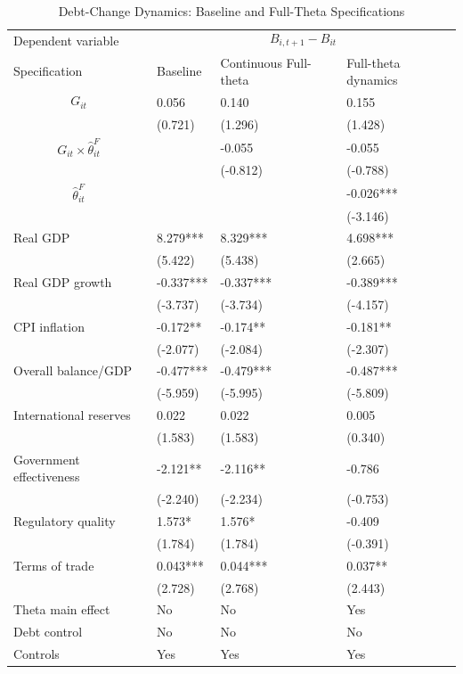 \begin{table}[H]\centering
\begin{threeparttable}
\caption{Debt-Change Dynamics: Baseline and Full-Theta Specifications}
\label{tab:debt_change_combined_fulltheta}
\scriptsize
\begin{tabularx}{\textwidth}{lYYY}
\toprule
Dependent variable &  \\
\cmidrule(lr){2-4}
Specification & Baseline & Continuous Full-theta & Full-theta dynamics \\
\midrule
$$G_{it}$$ & 0.056 & 0.140 & 0.155 \\
 & (0.721) & (1.296) & (1.428) \\
$$G_{it}\times\widehat{\theta}^{F}_{it}$$ &  & -0.055 & -0.055 \\
 &  & (-0.812) & (-0.788) \\
$$\widehat{\theta}^{F}_{it}$$ &  &  & -0.026*** \\
 &  &  & (-3.146) \\
Real GDP & 8.279*** & 8.329*** & 4.698*** \\
 & (5.422) & (5.438) & (2.665) \\
Real GDP growth & -0.337*** & -0.337*** & -0.389*** \\
 & (-3.737) & (-3.734) & (-4.157) \\
CPI inflation & -0.172** & -0.174** & -0.181** \\
 & (-2.077) & (-2.084) & (-2.307) \\
Overall balance/GDP & -0.477*** & -0.479*** & -0.487*** \\
 & (-5.959) & (-5.995) & (-5.809) \\
International reserves & 0.022 & 0.022 & 0.005 \\
 & (1.583) & (1.583) & (0.340) \\
Government effectiveness & -2.121** & -2.116** & -0.786 \\
 & (-2.240) & (-2.234) & (-0.753) \\
Regulatory quality & 1.573* & 1.576* & -0.409 \\
 & (1.784) & (1.784) & (-0.391) \\
Terms of trade & 0.043*** & 0.044*** & 0.037** \\
 & (2.728) & (2.768) & (2.443) \\
\midrule
Theta main effect & No & No & Yes \\
Debt control & No & No & No \\
Controls & Yes & Yes & Yes \\

\end{tabularx}
\end{threeparttable}
\end{table}

